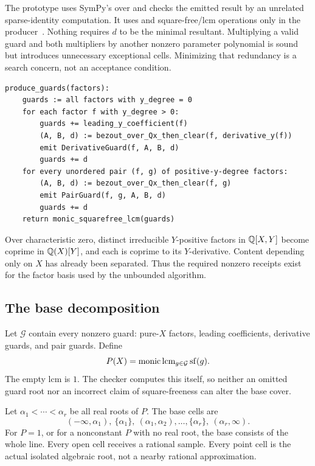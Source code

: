 The prototype uses SymPy's  over  and checks the emitted result by an unrelated sparse-identity computation. It uses  and square-free/lcm operations only in the producer~\cite{sympy}. Nothing requires $d$ to be the minimal resultant. Multiplying a valid guard and both multipliers by another nonzero parameter polynomial is sound but introduces unnecessary exceptional cells. Minimizing that redundancy is a search concern, not an acceptance condition.

\begin{lstlisting}
produce_guards(factors):
    guards := all factors with y_degree = 0
    for each factor f with y_degree > 0:
        guards += leading_y_coefficient(f)
        (A, B, d) := bezout_over_Qx_then_clear(f, derivative_y(f))
        emit DerivativeGuard(f, A, B, d)
        guards += d
    for every unordered pair (f, g) of positive-y-degree factors:
        (A, B, d) := bezout_over_Qx_then_clear(f, g)
        emit PairGuard(f, g, A, B, d)
        guards += d
    return monic_squarefree_lcm(guards)
\end{lstlisting}

Over characteristic zero, distinct irreducible $Y$-positive factors in $\mathbb Q[X,Y]$ become coprime in $\mathbb Q(X)[Y]$, and each is coprime to its $Y$-derivative. Content depending only on $X$ has already been separated. Thus the required nonzero receipts exist for the factor basis used by the unbounded algorithm.

\subsection{The base decomposition}
Let $\mathcal G$ contain every nonzero guard: pure-$X$ factors, leading coefficients, derivative guards, and pair guards. Define
\begin{equation}\label{eq:projection}
 P(X)=\operatorname{monic}\operatorname{lcm}_{g\in\mathcal G}\operatorname{sf}(g).
\end{equation}
The empty lcm is $1$. The checker computes this itself, so neither an omitted guard root nor an incorrect claim of square-freeness can alter the base cover.

Let $\alpha_1<\cdots<\alpha_r$ be all real roots of $P$. The base cells are
\[
 (-\infty,\alpha_1),\ \{\alpha_1\},\
 (\alpha_1,\alpha_2),\ldots,\{\alpha_r\},\
 (\alpha_r,\infty).
\]
For $P=1$, or for a nonconstant $P$ with no real root, the base consists of the whole line. Every open cell receives a rational sample. Every point cell is the actual isolated algebraic root, not a nearby rational approximation.

